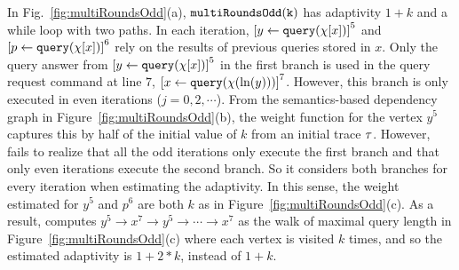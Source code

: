 
  In Fig.~\ref{fig:multiRoundsOdd}(a), %
$\mathtt{multiRoundsOdd(k)}$ has adaptivity $1 + k$ and a  while loop with two paths.
In each iteration, $\clabel{\assign{y}{\query(\chi[x])}}^{5}$
and $\clabel{\assign{p}{\query(\chi[x])}}^{6}$ rely on the results of previous queries stored in $x$.
Only the query answer from $\clabel{\assign{y}{\query(\chi[x])}}^{5}$ in the first branch
is used in the query request command at line $7$, $\clabel{\assign{x}{\query(\chi(\ln(y)))} }^{7}$.
However, this branch is only executed in even iterations ($j = 0, 2, \cdots $).
From the semantics-based dependency graph in Figure~\ref{fig:multiRoundsOdd}(b),
the weight function for the vertex $y^5$ 
captures this by half of the initial value of $k$ from an initial trace $\mathtt{\tau}$.
However, {\THESYSTEM} fails to realize that all the odd iterations only execute the first branch
and that only even iterations execute the second branch. 
So it considers both branches for every iteration when estimating the adaptivity. 
In this sense, the weight estimated for $y^5$ and $p^6$ are both 
$k$ as in Figure~\ref{fig:multiRoundsOdd}(c).
As a result, {\THESYSTEM} computes $y^5  \to x^7  \to y^5  \to \cdots \to x^7 $
as the walk of maximal query length in Figure~\ref{fig:multiRoundsOdd}(c)
where each vertex is visited $k$ times, and so the estimated adaptivity is $1 + 2 * k$, instead of $1 + k$. 
%



